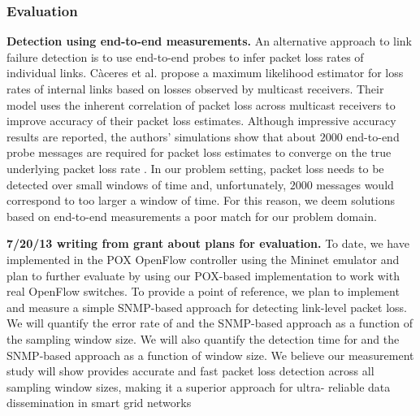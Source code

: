 




\subsubsection{\pcnt Evaluation}


{\bf Detection using end-to-end measurements.}
An alternative approach to link failure detection is to use end-to-end probes to infer packet loss rates of individual links. C\`{a}ceres et al. \cite{Caceres99} propose a maximum likelihood estimator
for loss rates of internal links based on losses observed by multicast receivers. Their model uses the inherent correlation of packet loss across multicast receivers to improve accuracy 
of their packet loss estimates.  Although impressive accuracy results are reported, the authors' simulations show that about $2000$ end-to-end probe messages are required for packet loss
estimates to converge on the true underlying packet loss rate \cite{Caceres99}.  In our problem setting, packet loss needs to be detected over small windows of time and, unfortunately,
$2000$ messages would correspond to too larger a window of time. For this reason, we deem solutions based on end-to-end measurements a poor match for our problem domain.

{\bf 7/20/13 writing from grant about plans for evaluation.}
To date, we have implemented \pcnt in the POX OpenFlow controller using the Mininet emulator and plan to further evaluate \pcnt by using our POX-based implementation to work with real
OpenFlow switches.  To provide a point of reference, we plan to implement and measure a simple SNMP-based approach for detecting link-level packet loss.  We will quantify the error rate of \pcnt 
and the SNMP-based approach as a function of the sampling window size.  We will also quantify the detection time for \pcnt and the SNMP-based approach as a function of window size. We believe our measurement study will show \pcnt  provides accurate and fast packet loss detection across all sampling window sizes, making it a superior approach for ultra- reliable data dissemination in smart grid networks








